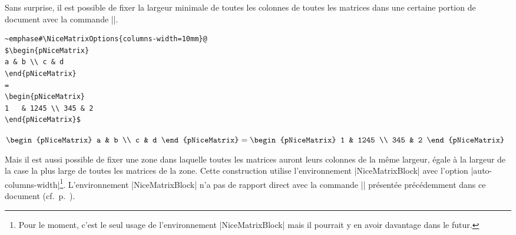 \documentclass[dvipsnames]{article}%
\begin{document}
\bigskip
Sans surprise, il est possible de fixer la largeur minimale de toutes les
colonnes de toutes les matrices dans une certaine portion de document avec la
commande |\NiceMatrixOptions|.\par\nobreak

\medskip
\begin{BVerbatim}[baseline=c,boxwidth=8.5cm]
~emphase#\NiceMatrixOptions{columns-width=10mm}@
$\begin{pNiceMatrix}
a & b \\ c & d 
\end{pNiceMatrix}
= 
\begin{pNiceMatrix}
1   & 1245 \\ 345 & 2 
\end{pNiceMatrix}$
\end{BVerbatim}
\begin{scope}
$\begin{pNiceMatrix}
a & b \\
c & d 
\end{pNiceMatrix}
= 
\begin{pNiceMatrix}
1   & 1245 \\
345 & 2 
\end{pNiceMatrix}$
\end{scope}


\bigskip
Mais il est aussi possible de fixer une zone dans laquelle toutes les matrices
auront leurs colonnes de la même largeur, égale à la largeur de la case la plus
large de toutes les matrices de la zone. Cette construction utilise
l'environnement |{NiceMatrixBlock}| avec l'option
|auto-columns-width|\footnote{Pour le moment, c'est le seul usage de
  l'environnement |{NiceMatrixBlock}| mais il pourrait y en avoir davantage dans
  le futur.}. L'environnement |{NiceMatrixBlock}| n'a pas de rapport direct avec
la commande |\Block| présentée précédemment dans ce document
(cf.~p.~\pageref{Block}).
\end{document}
